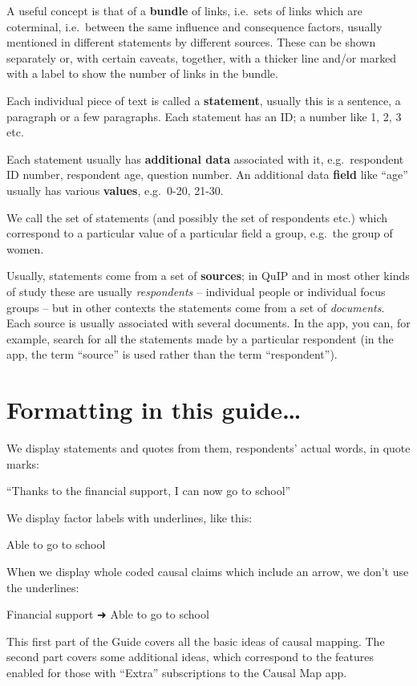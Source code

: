 \documentclass[
]{book}
\begin{document}
A useful concept is that of a \textbf{bundle} of links, i.e.~sets of links which are coterminal, i.e.~between the same influence and consequence factors, usually mentioned in different statements by different sources. These can be shown separately or, with certain caveats, together, with a thicker line and/or marked with a label to show the number of links in the bundle.

Each individual piece of text is called a \textbf{statement}, usually this is a sentence, a paragraph or a few paragraphs. Each statement has an ID; a number like 1, 2, 3 etc.

Each statement usually has \textbf{additional data} associated with it, e.g.~respondent ID number, respondent age, question number. An additional data \textbf{field} like ``age'' usually has various \textbf{values}, e.g.~0-20, 21-30.

We call the set of statements (and possibly the set of respondents etc.) which correspond to a particular value of a particular field a group, e.g.~the group of women.

Usually, statements come from a set of \textbf{sources}; in QuIP and in most other kinds of study these are usually \emph{respondents} -- individual people or individual focus groups -- but in other contexts the statements come from a set of \emph{documents}. Each source is usually associated with several documents. In the app, you can, for example, search for all the statements made by a particular respondent (in the app, the term ``source'' is used rather than the term ``respondent'').

\hypertarget{formatting-in-this-guide}{%
\section{Formatting in this guide\ldots{}}\label{formatting-in-this-guide}}

We display statements and quotes from them, respondents' actual words, in quote marks:

``Thanks to the financial support, I can now go to school''

We display factor labels with underlines, like this:

Able to go to school

When we display whole coded causal claims which include an arrow, we don't use the underlines:

Financial support ➜ Able to go to school

This first part of the Guide covers all the basic ideas of causal mapping. The second part covers some additional ideas, which correspond to the features enabled for those with ``Extra'' subscriptions to the Causal Map app.
\end{document}
